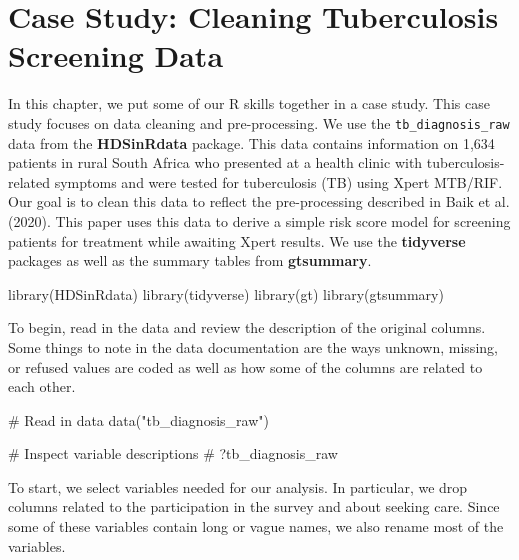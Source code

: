 \documentclass[
  letterpaper,
]{latex/krantz}
\makeatletter
\newenvironment{Shaded}{\begin{snugshade}}{\end{snugshade}}
\newcommand{\CommentTok}[1]{\textcolor[rgb]{0.37,0.37,0.37}{#1}}
\newcommand{\FunctionTok}[1]{\textcolor[rgb]{0.28,0.35,0.67}{#1}}
\newcommand{\NormalTok}[1]{\textcolor[rgb]{0.00,0.23,0.31}{#1}}
\newcommand{\StringTok}[1]{\textcolor[rgb]{0.13,0.47,0.30}{#1}}
\newenvironment{kframe}{%
\medskip{}
\setlength{\fboxsep}{.8em}
 \def\at@end@of@kframe{}%
 \ifinner\ifhmode%
  \def\at@end@of@kframe{\end{minipage}}%
  \begin{minipage}{\columnwidth}%
 \fi\fi%
 \def\FrameCommand##1{\hskip\@totalleftmargin \hskip-\fboxsep
 \colorbox{shadecolor}{##1}\hskip-\fboxsep
     \hskip-\linewidth \hskip-\@totalleftmargin \hskip\columnwidth}%
 \MakeFramed {\advance\hsize-\width
   \@totalleftmargin\z@ \linewidth\hsize
   \@setminipage}}%
 {\par\unskip\endMakeFramed%
 \at@end@of@kframe}
\renewenvironment{Shaded}{\begin{kframe}}{\end{kframe}}
\makeatother
\begin{document}
\chapter{Case Study: Cleaning Tuberculosis Screening
Data}\label{sec-cs-preprocessing}

In this chapter, we put some of our R skills together in a case
study. This case
study focuses on data cleaning and pre-processing. We use the
\texttt{tb\_diagnosis\_raw}
data from the \textbf{HDSinRdata} package.
This data contains information on 1,634 patients in rural South Africa
who presented at a health clinic with tuberculosis-related symptoms and
were tested for tuberculosis (TB) using Xpert MTB/RIF. Our goal is to
clean this data to reflect the pre-processing described in Baik et al.
(2020). This paper uses this data to derive a simple risk score model
for screening patients for treatment while awaiting Xpert results. We
use the \textbf{tidyverse} packages as well
as the summary tables from
\textbf{gtsummary}.

\begin{Shaded}
\begin{Highlighting}[]
\FunctionTok{library}\NormalTok{(HDSinRdata)}
\FunctionTok{library}\NormalTok{(tidyverse)}
\FunctionTok{library}\NormalTok{(gt)}
\FunctionTok{library}\NormalTok{(gtsummary)}
\end{Highlighting}
\end{Shaded}

To begin, read in the data and review the description of the original
columns. Some things to note in the data documentation are the ways
unknown, missing, or refused values are coded as well as how some of the
columns are related to each other.

\begin{Shaded}
\begin{Highlighting}[]
\CommentTok{\# Read in data}
\FunctionTok{data}\NormalTok{(}\StringTok{"tb\_diagnosis\_raw"}\NormalTok{)}

\CommentTok{\# Inspect variable descriptions}
\CommentTok{\# ?tb\_diagnosis\_raw}
\end{Highlighting}
\end{Shaded}

To start, we select variables needed for our analysis. In particular, we
drop columns related to the participation in the survey and about
seeking care. Since some of these variables contain long or vague names,
we also rename most of the variables.
\end{document}
